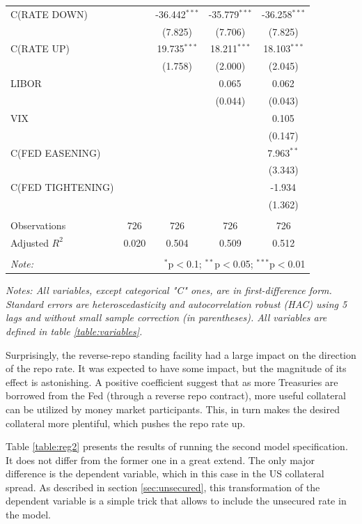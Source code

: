 \documentclass[11pt,a4paper,english,oneside]{article}
\begin{document}
\begin{table}[!htbp]
\begin{tabular}{@{\extracolsep{5pt}}lcccc}
 C(RATE DOWN) & & -36.442$^{***}$ & -35.779$^{***}$ & -36.258$^{***}$ \\
  & & (7.825) & (7.706) & (7.825) \\
 C(RATE UP) & & 19.735$^{***}$ & 18.211$^{***}$ & 18.103$^{***}$ \\
  & & (1.758) & (2.000) & (2.045) \\
 LIBOR & & & 0.065$^{}$ & 0.062$^{}$ \\
  & & & (0.044) & (0.043) \\
 VIX & & & & 0.105$^{}$ \\
  & & & & (0.147) \\
 C(FED EASENING) & & & & 7.963$^{**}$ \\
  & & & & (3.343) \\
 C(FED TIGHTENING) & & & & -1.934$^{}$ \\
  & & & & (1.362) \\
\hline \\[-1.8ex]
 Observations & 726 & 726 & 726 & 726 \\
 Adjusted $R^2$ & 0.020 & 0.504 & 0.509 & 0.512 \\
\hline
\hline \\[-1.8ex]
\textit{Note:} & \multicolumn{4}{r}{$^{*}$p$<$0.1; $^{**}$p$<$0.05; $^{***}$p$<$0.01} \\
\end{tabular}
\begin{flushleft}
  \textit{Notes: All variables, except categorical "C" ones, are in first-difference form. Standard errors are heteroscedasticity and autocorrelation robust (HAC) using 5 lags and without small sample correction (in parentheses). All variables are defined in table \ref{table:variables}.}
\end{flushleft}
\label{table:reg1}
\end{table}

Surprisingly, the reverse-repo standing facility had a large impact on the direction of the repo rate. It was expected to have some impact, but the magnitude of its effect is astonishing. A positive coefficient suggest that as more Treasuries are borrowed from the Fed (through a reverse repo contract), more useful collateral can be utilized by money market participants. This, in turn makes the desired collateral more plentiful, which pushes the repo rate up.

Table \ref{table:reg2} presents the results of running the second model specification. It does not differ from the former one in a great extend. The only major difference is the dependent variable, which in this case in the US collateral spread. As described in section \ref{sec:unsecured}, this transformation of the dependent variable is a simple trick that allows to include the unsecured rate in the model.
\end{document}
